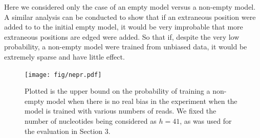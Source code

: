 \documentclass[letterpaper]{article}
\begin{document}
Here we considered only the case of an empty model versus a non-empty model. A
similar analysis can be conducted to show that if an extraneous position were
added to to the initial empty model, it would be very improbable that more
extraneous positions are edged were added. So that if, despite the very low
probability, a non-empty model were trained from unbiased data, it would be
extremely sparse and have little effect.



\begin{figure}[H]
\centerline{
\texttt{[image: fig/nepr.pdf]}}
\caption{Plotted is the upper bound on the probability of training a non-empty
model when there is no real bias in the experiment when the model is trained
with various numbers of reads. We fixed the number of nucleotides being
considered as $h = 41$, as was used for the evaluation in Section 3.}
\label{fig:nepr}
\end{figure}



\end{document}
